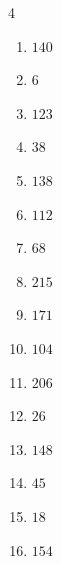 \begin{multicols}{4}
\begin{enumerate}
  \item $140$


  \item $6$


  \item $123$


  \item $38$


  \item $138$


  \item $112$


  \item $68$


  \item $215$


  \item $171$


  \item $104$


  \item $206$


  \item $26$


  \item $148$


  \item $45$


  \item $18$


\columnbreak %

  \item $154$


\end{enumerate}
\end{multicols}
